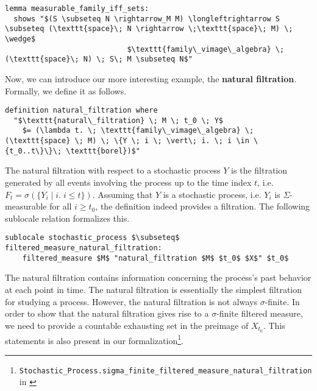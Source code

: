 \begin{isalemma}
{\small
\begin{lstlisting}[style=isabelle]
lemma measurable_family_iff_sets:
  shows "$(S \subseteq N \rightarrow_M M) \longleftrightarrow S \subseteq (\texttt{space}\; N \rightarrow \;\texttt{space}\; M) \; \wedge$
                            $\texttt{family\_vimage\_algebra} \; (\texttt{space}\; N) \; S\; M \subseteq N$"
\end{lstlisting}
}
\end{isalemma}

Now, we can introduce our more interesting example, the \textbf{natural filtration}. Formally, we define it as follows.

\begin{isadefinition}
{\small
\begin{lstlisting}[style=isabelle]
definition natural_filtration where
  "$\texttt{natural\_filtration} \; M \; t_0 \; Y$
	$= (\lambda t. \; \texttt{family\_vimage\_algebra} \; (\texttt{space} \; M) \; \{Y \; i \; \vert\; i. \; i \in \{t_0..t\}\}\; \texttt{borel})$"
\end{lstlisting}
}
\end{isadefinition}
The natural filtration with respect to a stochastic process $Y$ is the filtration generated by all events involving the process up to the time index $t$, i.e. $F_t = \sigma(\{Y_i \; \vert\; i. \; i \le t\})$. Assuming that $Y$ is a stochastic process, i.e. $Y_i$ is $\Sigma$-measurable for all $i \ge t_0$, the definition indeed provides a filtration. The following sublocale relation formalizes this.

\begin{isalemma}
{\small
\begin{lstlisting}[style=isabelle]
sublocale stochastic_process $\subseteq$ filtered_measure_natural_filtration: 
	filtered_measure $M$ "natural_filtration $M$ $t_0$ $X$" $t_0$
\end{lstlisting}
}
\end{isalemma}

The natural filtration contains information concerning the process's past behavior at each point in time. The natural filtration is essentially the simplest filtration for studying a process. However, the natural filtration is not always $\sigma$-finite. In order to show that the natural filtration gives rise to a $\sigma$-finite filtered measure, we need to provide a countable exhausting set in the preimage of $X_{t_0}$. This statements is also present in our formalization\footnote{\texttt{Stochastic\_Process.sigma\_finite\_filtered\_measure\_natural\_filtration} in \cite{Keskin_A_Formalization_of_2023}}.

